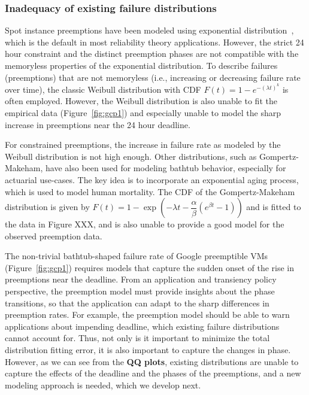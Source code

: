 
\subsubsection{Inadequacy of existing failure distributions}

Spot instance preemptions have been modeled using exponential distribution~\cite{sigcomm-bidcloud, hotcloud-notbid, flint}, which is the default in most reliability theory applications. 
However, the strict 24 hour constraint and the distinct preemption phases are not compatible with the memoryless properties of the exponential distribution. 
%
To describe failures (preemptions) that are not memoryless (i.e., increasing or decreasing failure rate over time), the classic Weibull distribution with CDF $F(t)=1-e^{-(\lambda t)^k}$ is often employed. However, the Weibull distribution is also unable to fit the empirical data (Figure~\ref{fig:gcp1}) and especially unable to model the sharp increase in preemptions near the 24 hour deadline. 

For constrained preemptions, the increase in failure rate as modeled by the Weibull distribution is not high enough.
Other distributions, such as Gompertz-Makeham, have also been used for modeling bathtub behavior, especially  for actuarial use-cases.
The key idea is to incorporate an exponential aging process, which is used to model human mortality.
The CDF of the Gompertz-Makeham distribution is given by $F(t) = 1 - \exp\left(-\lambda t - \dfrac{\alpha}{\beta}(e^{\beta t} - 1) \right)$
  and is fitted to the data in Figure XXX, and is also unable to provide a good model for the observed preemption data. 





The non-trivial bathtub-shaped failure rate of Google preemptible VMs (Figure~\ref{fig:gcp1}) requires models that capture the sudden onset of the rise in preemptions near the deadline.
From an application and transiency policy perspective, the preemption model must provide insights about the phase transitions, so that the application can adapt to the sharp differences in preemption rates.
%
For example, the preemption model should be able to warn applications about impending deadline, which existing failure distributions cannot account for. 
Thus, not only is it important to minimize the total distribution fitting error, it is also important to capture the changes in phase.
However, as we can see from the \textbf{QQ plots}, existing distributions are unable to capture the effects of the deadline and the phases of the preemptions, and a new modeling approach is needed, which we develop next.  

